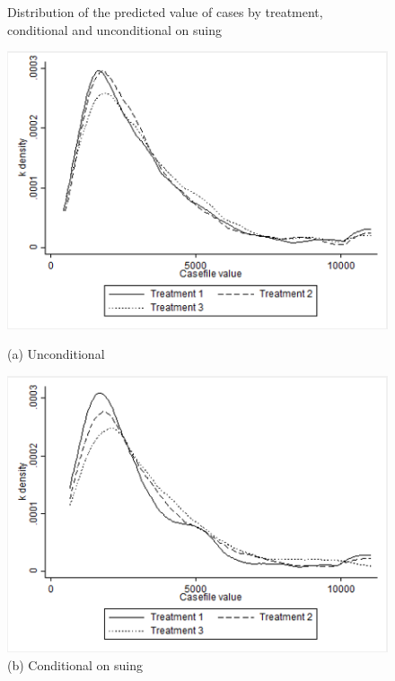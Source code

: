 \documentclass[oneside,12pt]{article}
\begin{document}
\begin{figure}[H]%
  \centering
  \caption{Distribution of the predicted value of cases by treatment, conditional and unconditional on suing}
  \begin{minipage}[b]{0.4\textwidth}
    \includegraphics[width=\textwidth]{Figures/Figure4_1.png}
    \caption*{(a) Unconditional}
  \end{minipage}
  \begin{minipage}[b]{0.4\textwidth}
    \includegraphics[width=\textwidth]{Figures/Figure4_2.png}
    \caption*{(b) Conditional on suing}
  \end{minipage}
  \label{fig:4}
\end{figure}%
\end{document}
